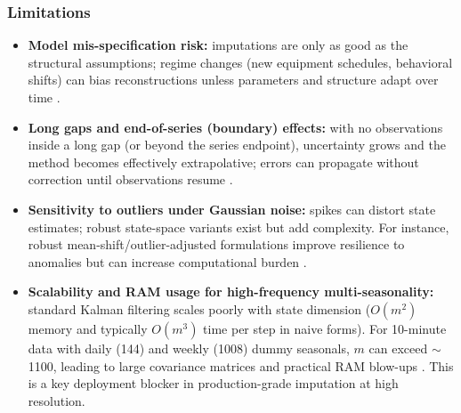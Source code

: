 \subsubsection*{Limitations}
\begin{itemize}
\item \textbf{Model mis-specification risk:} imputations are only as good as the structural assumptions; regime changes (new equipment schedules, behavioral shifts) can bias reconstructions unless parameters and structure adapt over time \cite{harvey1989}.
\item \textbf{Long gaps and end-of-series (boundary) effects:} with no observations inside a long gap (or beyond the series endpoint), uncertainty grows and the method becomes effectively extrapolative; errors can propagate without correction until observations resume \cite{durbin2012}.
\item \textbf{Sensitivity to outliers under Gaussian noise:} spikes can distort state estimates; robust state-space variants exist but add complexity. For instance, robust mean-shift/outlier-adjusted formulations improve resilience to anomalies but can increase computational burden \cite{shankar2023}.
\item \textbf{Scalability and RAM usage for high-frequency multi-seasonality:} standard Kalman filtering scales poorly with state dimension ($O(m^2)$ memory and typically $O(m^3)$ time per step in naive forms). For 10-minute data with daily (144) and weekly (1008) dummy seasonals, $m$ can exceed $\sim$1100, leading to large covariance matrices and practical RAM blow-ups \cite{durbin2012}. This is a key deployment blocker in production-grade imputation at high resolution.
\end{itemize}

